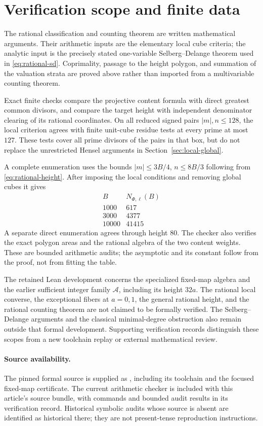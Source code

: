 \section{Verification scope and finite data}\label{sec:verification}

The rational classification and counting theorem are written mathematical
arguments. Their arithmetic inputs are the elementary local cube criteria;
the analytic input is the precisely stated one-variable
Selberg--Delange theorem used in \eqref{eq:rational-sd}. Coprimality,
passage to the height polygon, and summation of the valuation strata are
proved above rather than imported from a multivariable counting theorem.

Exact finite checks compare the projective content formula with direct
greatest common divisors, and compare the target height with independent
denominator clearing of its rational coordinates. On all reduced signed
pairs \(|m|,n\le128\), the local criterion agrees with finite unit-cube
residue tests at every prime at most \(127\). These tests cover all
prime divisors of the pairs in that box, but do not replace the unrestricted
Hensel arguments in Section~\ref{sec:local-global}.

A complete enumeration uses the bounds \(|m|\le3B/4\), \(n\le8B/3\)
following from \eqref{eq:rational-height}. After imposing the local
conditions and removing global cubes it gives
\[
\begin{array}{r|r}
B&N_{\Phi,\ell}(B)\\ \hline
1000&617\\
3000&4377\\
10000&41415
\end{array}
\]
A separate direct enumeration agrees through height \(80\).
The checker also verifies the exact polygon areas and the rational
algebra of the two content weights. These are bounded arithmetic audits;
the asymptotic and its constant follow from the proof, not from fitting
the table.

The retained Lean development concerns the specialized fixed-map algebra
and the earlier sufficient integer family \(\mathcal A\), including its
height \(32a\). The rational local converse, the exceptional fibers at
\(a=0,1\), the general rational height, and the rational counting theorem
are not claimed to be formally verified. The Selberg--Delange arguments
and the classical minimal-degree obstruction also remain outside that
formal development. Supporting verification records distinguish these
scopes from a new toolchain replay or external mathematical review.

\paragraph{Source availability.}
The pinned formal source is supplied as \cite{FormalSupplement}, including
its toolchain and the focused fixed-map certificate. The current arithmetic
checker is included with this article's source bundle, with commands and
bounded audit results in its verification record. Historical symbolic audits
whose source is absent are identified as historical there; they are not
present-tense reproduction instructions.
